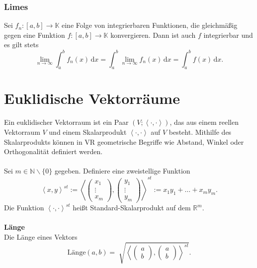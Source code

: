 \documentclass[a4paper,12pt]{article}
\newcommand{\td}{\,\text{d}}
\begin{document}
\subsubsection{Limes}
Sei $f_n:[a,b]\rightarrow \mathbb{K}$ eine Folge von integrierbaren Funktionen, die gleichmäßig gegen eine Funktion $f:[a,b]\rightarrow \mathbb{K}$ konvergieren. Dann ist auch $f$ integrierbar und es gilt stets
\[ 
        \lim_{n\rightarrow \infty}\int_{a}^{b}f_n\left(x\right)\td x=\int_{a}^{b}\lim_{n\rightarrow \infty}f_n\left(x\right)\td x=\int_{a}^{b}f\left(x\right)\td x
.\] 

\section{Euklidische Vektorräume}
Ein euklidischer Vektorraum ist ein Paar $\left(V;\left\langle \cdot ,\cdot \right\rangle \right)$, das aus einem reellen Vektorraum $V$ und einem Skalarprodukt $\left\langle \cdot ,\cdot \right\rangle $ auf $V$ besteht. Mithilfe des Skalarprodukts können in VR geometrische Begriffe wie Abstand, Winkel oder Orthogonalität definiert werden.\\\\
Sei $m \in \mathbb{N}\backslash \{0\}$ gegeben. Definiere eine zweistellige Funktion 
\[
        \left\langle x,y\right\rangle ^{s t}:=\left\langle \left(\begin{matrix}
        x_1\\\vdots \\x_m
\end{matrix}\right),\left(\begin{matrix}
        y_1\\\vdots \\y_m
\end{matrix}\right)\right\rangle ^{s t}:=x_1y_1+\hdots +x_my_m
.\]
Die Funktion $\left\langle \cdot ,\cdot \right\rangle ^{s t}$ heißt Standard-Skalarprodukt auf dem $\mathbb{R}^{m}$.
\\\hfill\\\textbf{Länge}\\ 
Die Länge eines Vektors
\[ 
        \text{Länge}\left(a,b\right)=\sqrt[]{\left\langle \left(\begin{matrix}
                a\\b
        \end{matrix}\right),\left(\begin{matrix}
                a\\b
        \end{matrix}\right)\right\rangle ^{s t}}
.\] 
\end{document}
